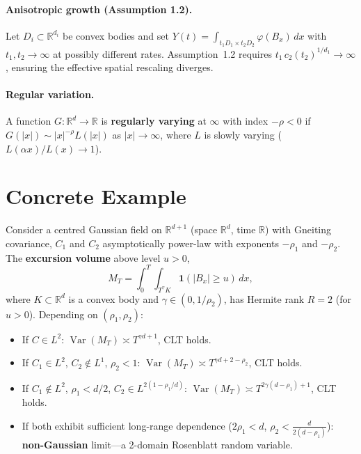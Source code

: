 \documentclass[11pt,a4paper]{article}
\begin{document}
\paragraph{Anisotropic growth (Assumption 1.2).}
Let $D_i \subset \mathbb{R}^{d_i}$ be convex bodies and set
$Y(t) = \int_{t_1 D_1 \times t_2 D_2} \varphi(B_x)\,dx$
with $t_1, t_2 \to \infty$ at possibly different rates.
Assumption~1.2 requires $t_1\,c_2(t_2)^{1/d_1} \to \infty$, ensuring the effective spatial rescaling diverges.

\paragraph{Regular variation.}
A function $G : \mathbb{R}^d \to \mathbb{R}$ is \textbf{regularly varying} at $\infty$ with index $-\rho < 0$ if $G(|x|) \sim |x|^{-\rho} L(|x|)$ as $|x| \to \infty$, where $L$ is slowly varying ($L(\alpha x)/L(x) \to 1$).

\section{Concrete Example}

Consider a centred Gaussian field on $\mathbb{R}^{d+1}$ (space $\mathbb{R}^d$, time $\mathbb{R}$) with Gneiting covariance, $C_1$ and $C_2$ asymptotically power-law with exponents $-\rho_1$ and $-\rho_2$.
The \textbf{excursion volume} above level $u > 0$,
\[
M_T = \int_0^T \int_{T^\gamma K} \mathbf{1}(|B_x| \ge u)\,dx,
\]
where $K \subset \mathbb{R}^d$ is a convex body and $\gamma \in (0, 1/\rho_2)$, has Hermite rank $R = 2$ (for $u > 0$).
Depending on $(\rho_1, \rho_2)$:
\begin{itemize}[nosep]
  \item If $C \in L^2$: $\operatorname{Var}(M_T) \asymp T^{\gamma d + 1}$, CLT holds.
  \item If $C_1 \in L^2$, $C_2 \notin L^1$, $\rho_2 < 1$: $\operatorname{Var}(M_T) \asymp T^{\gamma d + 2 - \rho_2}$, CLT holds.
  \item If $C_1 \notin L^2$, $\rho_1 < d/2$, $C_2 \in L^{2(1-\rho_1/d)}$: $\operatorname{Var}(M_T) \asymp T^{2\gamma(d-\rho_1)+1}$, CLT holds.
  \item If both exhibit sufficient long-range dependence ($2\rho_1 < d$, $\rho_2 < \tfrac{d}{2(d-\rho_1)}$): \textbf{non-Gaussian} limit---a 2-domain Rosenblatt random variable.
\end{itemize}
\end{document}
